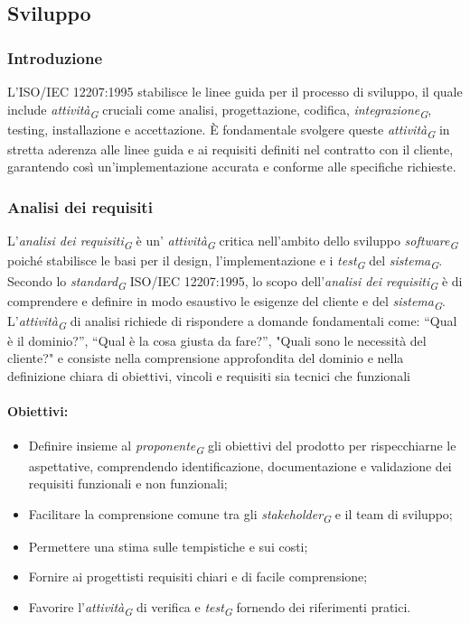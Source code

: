 \subsection{Sviluppo}

\subsubsection{Introduzione}
L'ISO/IEC 12207:1995 stabilisce le linee guida per il processo di sviluppo, il quale include \textit{attività}\textsubscript{\textit{G}} cruciali come analisi, progettazione, codifica, \textit{integrazione}\textsubscript{\textit{G}}, testing, installazione e accettazione. È fondamentale svolgere queste \textit{attività}\textsubscript{\textit{G}} in stretta aderenza alle linee guida e ai requisiti definiti nel contratto con il cliente, garantendo così un'implementazione accurata e conforme alle specifiche richieste.

\subsubsection{Analisi dei requisiti}
L'\textit{analisi dei requisiti}\textsubscript{\textit{G}} è un' \textit{attività}\textsubscript{\textit{G}} critica nell'ambito dello sviluppo \textit{software}\textsubscript{\textit{G}} poiché stabilisce le basi per il design, l'implementazione e i \textit{test}\textsubscript{\textit{G}} del \textit{sistema}\textsubscript{\textit{G}}. \\
Secondo lo \textit{standard}\textsubscript{\textit{G}} ISO/IEC 12207:1995, lo scopo dell'\textit{analisi dei requisiti}\textsubscript{\textit{G}} è di comprendere e definire in modo esaustivo le esigenze del cliente e del \textit{sistema}\textsubscript{\textit{G}}. \\
L’\textit{attività}\textsubscript{\textit{G}} di analisi richiede di rispondere a domande fondamentali come: “Qual è il dominio?”, “Qual è la cosa giusta da fare?”, "Quali sono le necessità del cliente?" e consiste nella comprensione approfondita del dominio e nella definizione chiara di obiettivi, vincoli e requisiti sia tecnici che funzionali
\paragraph{Obiettivi:}
\begin{itemize}
    \item Definire insieme al \textit{proponente}\textsubscript{\textit{G}} gli obiettivi del prodotto per rispecchiarne le aspettative, comprendendo identificazione, documentazione e validazione dei requisiti funzionali e non funzionali;
    \item Facilitare la comprensione comune tra gli \textit{stakeholder}\textsubscript{\textit{G}} e il team di sviluppo;
    \item Permettere una stima sulle tempistiche e sui costi;
    \item Fornire ai progettisti requisiti chiari e di facile comprensione;
    \item Favorire l'\textit{attività}\textsubscript{\textit{G}} di verifica e \textit{test}\textsubscript{\textit{G}} fornendo dei riferimenti pratici.
\end{itemize}

